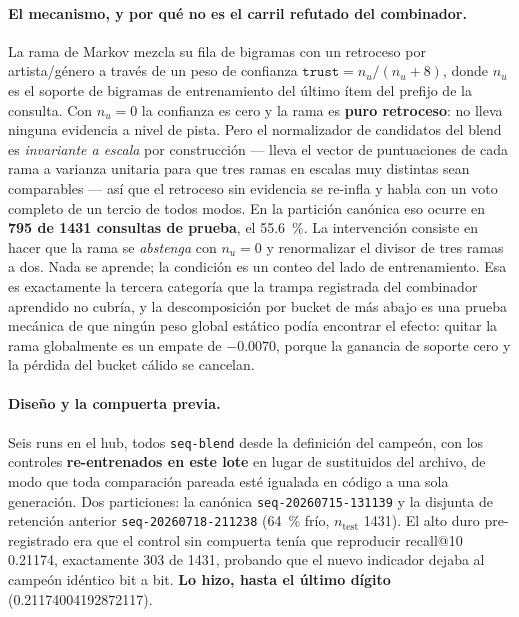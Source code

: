 \documentclass[11pt]{article}
\newcommand{\dsid}[1]{\texttt{\small #1}}
\begin{document}
\paragraph{El mecanismo, y por qué no es el carril refutado del combinador.} La
rama de Markov mezcla su fila de bigramas con un retroceso por artista/género a
través de un peso de confianza $\texttt{trust} = n_u/(n_u+8)$, donde $n_u$ es el
soporte de bigramas de entrenamiento del último ítem del prefijo de la consulta.
Con $n_u = 0$ la confianza es cero y la rama es \textbf{puro retroceso}: no lleva
ninguna evidencia a nivel de pista. Pero el normalizador de candidatos del blend es
\emph{invariante a escala} por construcción --- lleva el vector de puntuaciones de
cada rama a varianza unitaria para que tres ramas en escalas muy distintas sean
comparables --- así que el retroceso sin evidencia se re-infla y habla con un voto
completo de un tercio de todos modos. En la partición canónica eso ocurre en
\textbf{\num{795} de \num{1431} consultas de prueba}, el \SI{55.6}{\percent}. La
intervención consiste en hacer que la rama se \emph{abstenga} con $n_u = 0$ y
renormalizar el divisor de tres ramas a dos. Nada se aprende; la condición es un
conteo del lado de entrenamiento. Esa es exactamente la tercera categoría que la
trampa registrada del combinador aprendido no cubría, y la descomposición por
bucket de más abajo es una prueba mecánica de que ningún peso global estático podía
encontrar el efecto: quitar la rama globalmente es un empate de $-\num{0.0070}$,
porque la ganancia de soporte cero y la pérdida del bucket cálido se cancelan.

\paragraph{Diseño y la compuerta previa.} Seis runs en el hub, todos
\texttt{seq-blend} desde la definición del campeón, con los controles
\textbf{re-entrenados en este lote} en lugar de sustituidos del archivo, de modo que
toda comparación pareada esté igualada en código a una sola generación. Dos
particiones: la canónica \dsid{seq-20260715-131139} y la disjunta de retención
anterior \dsid{seq-20260718-211238} (\SI{64}{\percent} frío,
$n_{\mathrm{test}}$ \num{1431}). El alto duro pre-registrado era que el control sin
compuerta tenía que reproducir recall@10 \num{0.21174}, exactamente \num{303} de
\num{1431}, probando que el nuevo indicador dejaba al campeón idéntico bit a bit.
\textbf{Lo hizo, hasta el último dígito} (\num{0.21174004192872117}).
\end{document}
